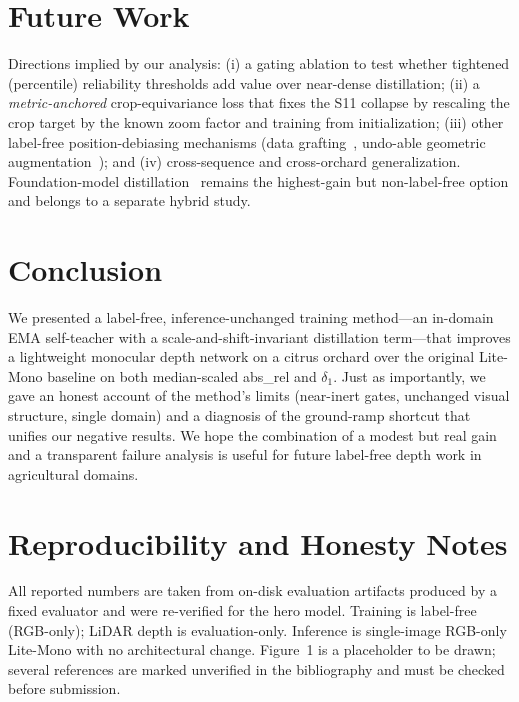 \documentclass[conference]{IEEEtran}
\begin{document}
\section{Future Work}
\label{sec:future}
Directions implied by our analysis: (i) a gating ablation to test whether
tightened (percentile) reliability thresholds add value over near-dense
distillation; (ii) a \emph{metric-anchored} crop-equivariance loss that fixes
the S11 collapse by rescaling the crop target by the known zoom factor and
training from initialization; (iii) other label-free position-debiasing
mechanisms (data grafting~\cite{peng2021epcdepth}, undo-able geometric
augmentation~\cite{wu2024augundo}); and (iv) cross-sequence and cross-orchard
generalization. Foundation-model distillation~\cite{yang2024depthanything}
remains the highest-gain but non-label-free option and belongs to a separate
hybrid study.

\section{Conclusion}
We presented a label-free, inference-unchanged training method---an in-domain
EMA self-teacher with a scale-and-shift-invariant distillation term---that
improves a lightweight monocular depth network on a citrus orchard over the
original Lite-Mono baseline on both median-scaled abs\_rel and $\delta_1$. Just as
importantly, we gave an honest account of the method's limits (near-inert gates,
unchanged visual structure, single domain) and a diagnosis of the ground-ramp
shortcut that unifies our negative results. We hope the combination of a modest
but real gain and a transparent failure analysis is useful for future label-free
depth work in agricultural domains.

\section*{Reproducibility and Honesty Notes}
All reported numbers are taken from on-disk evaluation artifacts produced by a
fixed evaluator and were re-verified for the hero model. Training is label-free
(RGB-only); LiDAR depth is evaluation-only. Inference is single-image RGB-only
Lite-Mono with no architectural change. Figure~1 is a placeholder to be drawn;
several references are marked unverified in the bibliography and must be checked
before submission.



\end{document}
